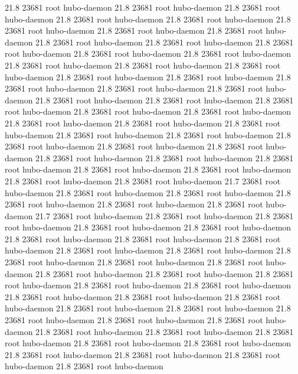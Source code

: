 21.8 23681 root     hubo-daemon
21.8 23681 root     hubo-daemon
21.8 23681 root     hubo-daemon
21.8 23681 root     hubo-daemon
21.8 23681 root     hubo-daemon
21.8 23681 root     hubo-daemon
21.8 23681 root     hubo-daemon
21.8 23681 root     hubo-daemon
21.8 23681 root     hubo-daemon
21.8 23681 root     hubo-daemon
21.8 23681 root     hubo-daemon
21.8 23681 root     hubo-daemon
21.8 23681 root     hubo-daemon
21.8 23681 root     hubo-daemon
21.8 23681 root     hubo-daemon
21.8 23681 root     hubo-daemon
21.8 23681 root     hubo-daemon
21.8 23681 root     hubo-daemon
21.8 23681 root     hubo-daemon
21.8 23681 root     hubo-daemon
21.8 23681 root     hubo-daemon
21.8 23681 root     hubo-daemon
21.8 23681 root     hubo-daemon
21.8 23681 root     hubo-daemon
21.8 23681 root     hubo-daemon
21.8 23681 root     hubo-daemon
21.8 23681 root     hubo-daemon
21.8 23681 root     hubo-daemon
21.8 23681 root     hubo-daemon
21.8 23681 root     hubo-daemon
21.8 23681 root     hubo-daemon
21.8 23681 root     hubo-daemon
21.8 23681 root     hubo-daemon
21.8 23681 root     hubo-daemon
21.8 23681 root     hubo-daemon
21.8 23681 root     hubo-daemon
21.8 23681 root     hubo-daemon
21.8 23681 root     hubo-daemon
21.8 23681 root     hubo-daemon
21.8 23681 root     hubo-daemon
21.8 23681 root     hubo-daemon
21.7 23681 root     hubo-daemon
21.8 23681 root     hubo-daemon
21.8 23681 root     hubo-daemon
21.8 23681 root     hubo-daemon
21.8 23681 root     hubo-daemon
21.8 23681 root     hubo-daemon
21.7 23681 root     hubo-daemon
21.8 23681 root     hubo-daemon
21.8 23681 root     hubo-daemon
21.8 23681 root     hubo-daemon
21.8 23681 root     hubo-daemon
21.8 23681 root     hubo-daemon
21.8 23681 root     hubo-daemon
21.8 23681 root     hubo-daemon
21.8 23681 root     hubo-daemon
21.8 23681 root     hubo-daemon
21.8 23681 root     hubo-daemon
21.8 23681 root     hubo-daemon
21.8 23681 root     hubo-daemon
21.8 23681 root     hubo-daemon
21.8 23681 root     hubo-daemon
21.8 23681 root     hubo-daemon
21.8 23681 root     hubo-daemon
21.8 23681 root     hubo-daemon
21.8 23681 root     hubo-daemon
21.8 23681 root     hubo-daemon
21.8 23681 root     hubo-daemon
21.8 23681 root     hubo-daemon
21.8 23681 root     hubo-daemon
21.8 23681 root     hubo-daemon
21.8 23681 root     hubo-daemon
21.8 23681 root     hubo-daemon
21.8 23681 root     hubo-daemon
21.8 23681 root     hubo-daemon
21.8 23681 root     hubo-daemon
21.8 23681 root     hubo-daemon
21.8 23681 root     hubo-daemon
21.8 23681 root     hubo-daemon
21.8 23681 root     hubo-daemon
21.8 23681 root     hubo-daemon
21.8 23681 root     hubo-daemon

